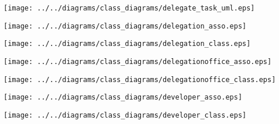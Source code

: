     \begin{frame}
    \begin{center}
    \texttt{[image: ../../diagrams/class\_diagrams/delegate\_task\_uml.eps]}
    \end{center}
    \end{frame}
    

    \begin{frame}
    \begin{center}
    \texttt{[image: ../../diagrams/class\_diagrams/delegation\_asso.eps]}
    \end{center}
    \end{frame}
    

    \begin{frame}
    \begin{center}
    \texttt{[image: ../../diagrams/class\_diagrams/delegation\_class.eps]}
    \end{center}
    \end{frame}
    

    \begin{frame}
    \begin{center}
    \texttt{[image: ../../diagrams/class\_diagrams/delegationoffice\_asso.eps]}
    \end{center}
    \end{frame}
    

    \begin{frame}
    \begin{center}
    \texttt{[image: ../../diagrams/class\_diagrams/delegationoffice\_class.eps]}
    \end{center}
    \end{frame}
    

    \begin{frame}
    \begin{center}
    \texttt{[image: ../../diagrams/class\_diagrams/developer\_asso.eps]}
    \end{center}
    \end{frame}
    

    \begin{frame}
    \begin{center}
    \texttt{[image: ../../diagrams/class\_diagrams/developer\_class.eps]}
    \end{center}
    \end{frame}
    

